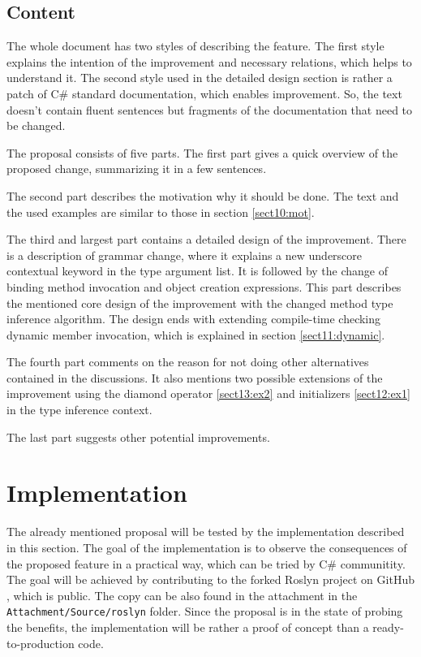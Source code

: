 \subsection{Content}

The whole document has two styles of describing the feature. 
The first style explains the intention of the improvement and necessary relations, which helps to understand it. 
The second style used in the detailed design section is rather a patch of C\# standard documentation, which enables improvement. 
So, the text doesn’t contain fluent sentences but fragments of the documentation that need to be changed.
\par
The proposal consists of five parts. 
The first part gives a quick overview of the proposed change, summarizing it in a few sentences.
\par
The second part describes the motivation why it should be done. The text
and the used examples are similar to those in section \ref{sect10:mot}.
\par
The third and largest part contains a detailed design of the improvement. 
There is a description of grammar change, where it explains a new underscore contextual keyword in the type argument list. 
It is followed by the change of binding method invocation and object creation expressions. 
This part describes the mentioned core design of the improvement with the changed method type inference algorithm. 
The design ends with extending compile-time checking dynamic member invocation, which is explained in section \ref{sect11:dynamic}.
\par
The fourth part comments on the reason for not doing other alternatives contained in the discussions. 
It also mentions two possible extensions of the improvement using the diamond operator \ref{sect13:ex2} and initializers \ref{sect12:ex1} in the type inference context.
\par
The last part suggests other potential improvements.

\section{Implementation}

The already mentioned proposal will be tested by the implementation described in this section. 
The goal of the implementation is to observe the consequences of the proposed feature in a practical way, which can be tried by C\# communitity. 
The goal will be achieved by contributing to the forked Roslyn project on GitHub \cite{online:roslynFork}, which is public.
The copy can be also found in the attachment in the \texttt{Attachment/Source/roslyn} folder. 
Since the proposal is in the state of probing the benefits, the implementation will be rather a proof of concept than a ready-to-production code.

